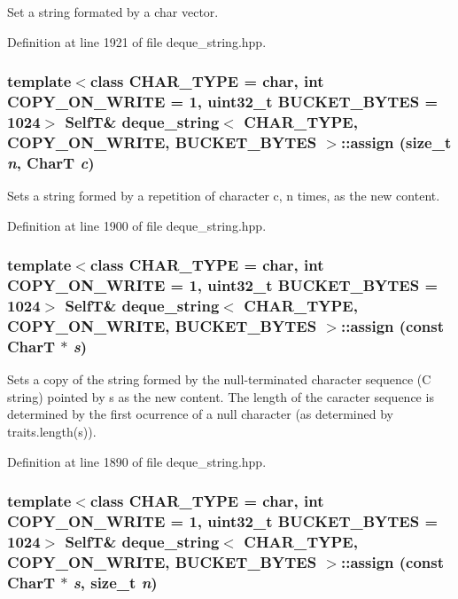 Set a string formated by a char vector. 

Definition at line 1921 of file deque\_\-string.hpp.\hypertarget{classdeque__string_131a536647ad8f6ad580addff43c6fc4}{
\subsubsection[{assign}]{\setlength{\rightskip}{0pt plus 5cm}template$<$class CHAR\_\-TYPE  = char, int COPY\_\-ON\_\-WRITE = 1, uint32\_\-t BUCKET\_\-BYTES = 1024$>$ {\bf SelfT}\& {\bf deque\_\-string}$<$ CHAR\_\-TYPE, COPY\_\-ON\_\-WRITE, BUCKET\_\-BYTES $>$::assign (size\_\-t {\em n}, \/  CharT {\em c})}}
\label{classdeque__string_131a536647ad8f6ad580addff43c6fc4}


Sets a string formed by a repetition of character c, n times, as the new content. 

Definition at line 1900 of file deque\_\-string.hpp.\hypertarget{classdeque__string_6011b5371797b1a7ce8e0f98de3892e2}{
\subsubsection[{assign}]{\setlength{\rightskip}{0pt plus 5cm}template$<$class CHAR\_\-TYPE  = char, int COPY\_\-ON\_\-WRITE = 1, uint32\_\-t BUCKET\_\-BYTES = 1024$>$ {\bf SelfT}\& {\bf deque\_\-string}$<$ CHAR\_\-TYPE, COPY\_\-ON\_\-WRITE, BUCKET\_\-BYTES $>$::assign (const CharT $\ast$ {\em s})}}
\label{classdeque__string_6011b5371797b1a7ce8e0f98de3892e2}


Sets a copy of the string formed by the null-terminated character sequence (C string) pointed by s as the new content. The length of the caracter sequence is determined by the first ocurrence of a null character (as determined by traits.length(s)). 

Definition at line 1890 of file deque\_\-string.hpp.\hypertarget{classdeque__string_df1494cee904a87cd5dd927b9bb2a3bf}{
\subsubsection[{assign}]{\setlength{\rightskip}{0pt plus 5cm}template$<$class CHAR\_\-TYPE  = char, int COPY\_\-ON\_\-WRITE = 1, uint32\_\-t BUCKET\_\-BYTES = 1024$>$ {\bf SelfT}\& {\bf deque\_\-string}$<$ CHAR\_\-TYPE, COPY\_\-ON\_\-WRITE, BUCKET\_\-BYTES $>$::assign (const CharT $\ast$ {\em s}, \/  size\_\-t {\em n})}}
\label{classdeque__string_df1494cee904a87cd5dd927b9bb2a3bf}


